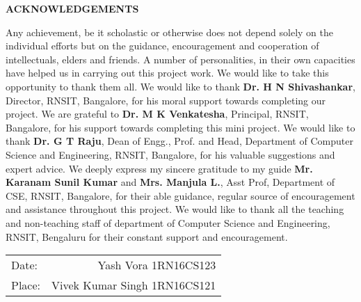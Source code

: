 \thispagestyle{empty}
\begin{center}
\textup{\large{\textbf{ACKNOWLEDGEMENTS}}} \\[0.1in]
\end{center}

\justify
\indent
Any achievement, be it scholastic or otherwise does not depend solely on the individual efforts but on the guidance, encouragement and cooperation of intellectuals, elders and friends. A number of personalities, in their own capacities have helped us in carrying out this project work. We would like to take this opportunity to thank them all.
We would like to thank \textbf{Dr. H N Shivashankar}, Director, RNSIT, Bangalore, for his moral support towards completing our project.
We are grateful to \textbf{Dr. M K Venkatesha}, Principal, RNSIT, Bangalore, for his support towards completing this mini project.
We would like to thank \textbf{Dr. G T Raju}, Dean of Engg., Prof. and Head, Department of Computer Science and Engineering, RNSIT, Bangalore, for his valuable suggestions and expert advice.
We deeply express my sincere gratitude to my guide \textbf{Mr. Karanam Sunil Kumar} and \textbf{Mrs. Manjula L.}, Asst Prof, Department of CSE, RNSIT, Bangalore, for their able guidance, regular source of encouragement and assistance throughout this project.
We would like to thank all the teaching and non-teaching staff of department of Computer Science and Engineering, RNSIT, Bengaluru for their constant support and encouragement.\\[5in]
\justify
\begin{tabular}{l r}
\textup{Date:} & \hspace{9cm}\textup{Yash Vora 1RN16CS123}\\
\textup{Place:} & \hspace{9cm}\textup{Vivek Kumar Singh 1RN16CS121}
\end{tabular}


\pagebreak